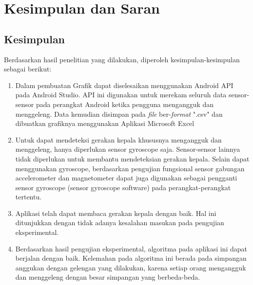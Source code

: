 \chapter{Kesimpulan dan Saran}
\label{chap:kesimpulan_dan_saran}

\section{Kesimpulan}
\label{sec:kesimpulan}
Berdasarkan hasil penelitian yang dilakukan, diperoleh kesimpulan-kesimpulan sebagai berikut:

\begin{enumerate}
    \item Dalam pembuatan Grafik dapat diselesaikan menggunakan Android API pada Android Studio. API ini digunakan untuk merekam seluruh data sensor-sensor pada perangkat Android ketika pengguna mengangguk dan menggeleng. Data kemudian disimpan pada \textit{file} ber-\textit{format} ".csv" dan dibuatkan grafiknya menggunakan Aplikasi Microsoft Excel
    \item Untuk dapat mendeteksi gerakan kepala khususnya mengangguk dan menggeleng, hanya diperlukan sensor gyroscope saja. Sensor-sensor lainnya tidak diperlukan untuk membantu mendeteksian gerakan kepala. Selain dapat menggunakan gyroscope, berdasarkan pengujian fungsional sensor gabungan accelerometer dan magnetometer dapat juga digunakan sebagai pengganti sensor gyroscope (sensor gyroscope software) pada perangkat-perangkat tertentu. 
    \item Aplikasi telah dapat membaca gerakan kepala dengan baik. Hal ini ditunjukkan dengan tidak adanya kesalahan masukan pada pengujian eksperimental. 
    \item Berdasarkan hasil pengujian eksperimental, algoritma pada aplikasi ini dapat berjalan dengan baik. Kelemahan pada algoritma ini berada pada simpangan anggukan dengan gelengan yang dilakukan, karena setiap orang mengangguk dan menggeleng dengan besar simpangan yang berbeda-beda.
\end{enumerate}

